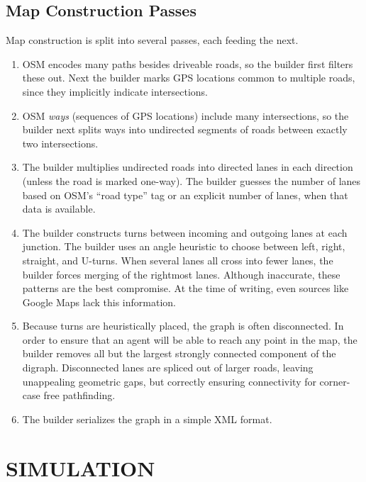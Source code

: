 \documentclass[letterpaper, 10 pt, conference]{ieeeconf}  %
\begin{document}
\subsection{Map Construction Passes}

Map construction is split into several passes, each feeding the next.
\begin{enumerate}
  \item OSM encodes many paths besides driveable roads, so the builder first filters
        these out. Next the builder marks GPS locations common to multiple roads, since
        they implicitly indicate intersections.
  \item OSM \emph{ways} (sequences of GPS locations) include many
        intersections, so the builder next splits ways into undirected
        segments of roads between exactly two intersections.
  \item The builder multiplies undirected roads into directed lanes in each direction
        (unless the road is marked one-way). The builder guesses the number of lanes based on
        OSM's ``road type'' tag or an explicit number of lanes, when that data is available.
  \item The builder constructs turns between incoming and outgoing lanes at each
        junction. The builder uses an angle heuristic to choose between left, right, straight,
        and U-turns. When several lanes all cross into fewer lanes,
        the builder forces merging of the rightmost lanes.  Although inaccurate,
        these patterns are the best compromise. At the time of writing, even sources
        like Google Maps \cite{googleMaps} lack this information.
  \item Because turns are heuristically placed, the graph is often
        disconnected. In order to ensure that an agent will be able to reach any point in the map,
        the builder removes all but the largest strongly connected component of the digraph.
        Disconnected lanes are spliced out of larger roads, leaving unappealing
        geometric gaps, but correctly ensuring connectivity for corner-case free
        pathfinding.
  \item The builder serializes the graph in a simple XML format.
\end{enumerate}


\section{SIMULATION}
\label{sec:simulation}
\end{document}
